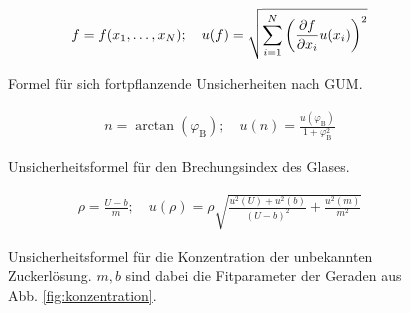 \begin{figure}[ht]
	\begin{align*}
		f = f(x_1, \dots , x_N)
		;\quad
		u(f) = \sqrt{\sum_{i = 1}^{N}\left(\pdv{f}{x_i} u(x_i)\right) ^2}
	\end{align*}
	\caption{Formel für sich fortpflanzende Unsicherheiten nach GUM.}
	\label{fig:GUM_formula}
\end{figure}

\begin{figure}[ht]
	\begin{align*}
		n = \arctan(\varphi_\text{B})
		;\quad
		u(n) = \frac{u(\varphi_\text{B})}{1 + \varphi_\text{B}^2}
	\end{align*}
	\caption{Unsicherheitsformel für den Brechungsindex des Glases.}
	\label{unc:n_glas}
\end{figure}

\begin{figure}[ht]
	\begin{align*}
		\rho = \frac{U - b}{m}
		;\quad
		u(\rho) = \rho \sqrt{\frac{u^2(U) + u^2(b)}{(U - b)^2} + \frac{u^2(m)}{m^2}}
	\end{align*}
	\caption{Unsicherheitsformel für die Konzentration der unbekannten Zuckerlösung. $m, b$ sind dabei die Fitparameter der Geraden aus Abb. \ref{fig:konzentration}.}
	\label{unc:U_konzentration}
\end{figure}

